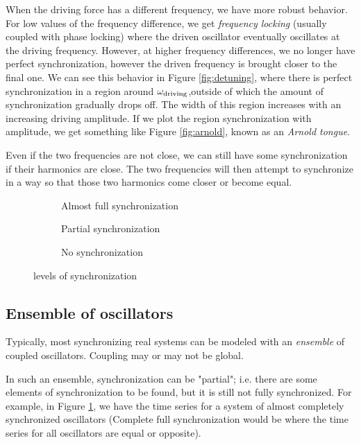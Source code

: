 \documentclass[12pt]{article}
\begin{document}
When the driving force has a different frequency, we have more robust behavior. For low values of the frequency difference, we get \emph{frequency locking} (usually coupled with phase locking) where the driven oscillator eventually oscillates at the driving frequency. However, at higher frequency differences, we no longer have perfect synchronization, however the driven frequency is brought closer to the final one. We can see this behavior in Figure \ref{fig:detuning}, where there is perfect synchronization in a region around $\omega_{\rm driving}$,outside of which the amount of synchronization gradually drops off. The width of this region increases with an increasing driving amplitude. If we plot the region synchronization with amplitude, we get something like Figure \ref{fig:arnold}, known as an \emph{Arnold tongue}\cite{pikovsky2001synchronization}.

Even if the two frequencies are not close, we can still have some synchronization if their harmonics are close. The two frequencies will then attempt to synchronize in a way so that those two harmonics come closer or become equal.
\begin{figure}
\centering
\begin{subfigure}[b]{0.4\textwidth}
\centering

\caption{Almost full synchronization}\label{fig:fullgraph}
\end{subfigure}
\begin{subfigure}[b]{0.4\textwidth}
\centering

\caption{Partial synchronization}\label{fig:partialgraph}
\end{subfigure}

\centering
\begin{subfigure}[b]{0.4\textwidth}
\centering

\caption{No synchronization}\label{fig:nograph}
\end{subfigure}
\caption{levels of synchronization}
\end{figure}

\subsection{Ensemble of oscillators}

Typically, most synchronizing real systems can be modeled with an \emph{ensemble} of coupled oscillators. Coupling may or may not be global.


In such an ensemble, synchronization can be "partial"; i.e. there are some elements of synchronization to be found, but it is still not fully synchronized. For example, in Figure \ref{fig:fullgraph}, we have the time series for a system of almost completely synchronized oscillators (Complete full synchronization would be where the time series for all oscillators are equal or opposite).
\end{document}
